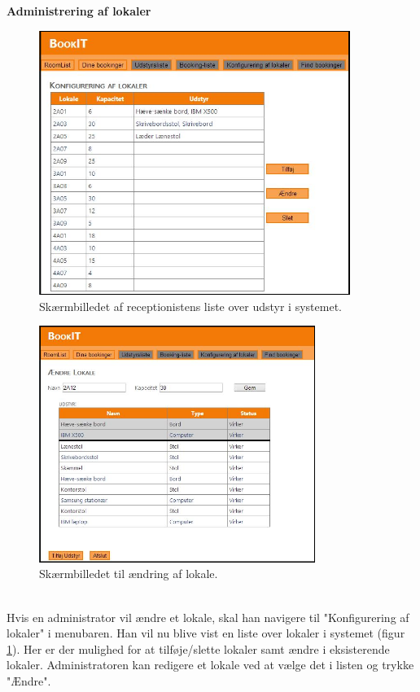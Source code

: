 \textbf{Administrering af lokaler}
\begin{figure}[h!]
  \centering
    \includegraphics[width=0.9\textwidth]{Appendix/GUI-Prototype/DigitalMockup/LokaleListe}
  \caption{Skærmbilledet af receptionistens liste over udstyr i systemet.}
\label{Design_G_Development_LokaleListe_Final}
\end{figure}
\begin{figure}[h!]
  \centering
    \includegraphics[width=0.8\textwidth]{Appendix/GUI-Prototype/DigitalMockup/AendreLokale}
  \caption{Skærmbilledet til ændring af lokale.}
\label{Design_G_Development_AendreLokale_Final}
\end{figure} 
\\Hvis en administrator vil ændre et lokale, skal han navigere til "Konfigurering af lokaler" i menubaren. Han vil nu blive vist en liste over lokaler i systemet (figur \ref{Design_G_Development_LokaleListe_Final}). Her er der mulighed for at tilføje/slette lokaler samt ændre i eksisterende lokaler. Administratoren kan redigere et lokale ved at vælge det i listen og trykke "Ændre". 
